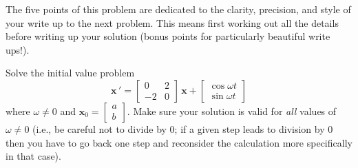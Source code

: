 \documentclass[11pt,letterpaper,boxed]{hmcpset}
\begin{document}
\begin{problem}[3.] The five points of this problem are dedicated to the clarity, precision, and style of your write up to the next problem.  This means first
working out all the details before writing up your solution (bonus points for particularly beautiful write ups!). 
\end{problem}

\begin{solution}
\vfill
\end{solution}
\newpage

\begin{problem}[4.] Solve the initial value problem
\[  \mathbf{x} \, ' = \begin{bmatrix} 0 & 2 \\ -2 & 0 \end{bmatrix} \, \mathbf{x} + \begin{bmatrix} \cos \omega t \\ \sin \omega t \end{bmatrix}  \]
where $\omega \neq 0$ and $\mathbf{x}_0 = \begin{bmatrix} a \\ b \end{bmatrix}$.
  Make sure your solution is valid for \textit{all} values of $\omega \neq 0$ (i.e., 
 be careful not to divide by $0$; if a given step leads to division by $0$ then you have to go back one step and reconsider the calculation more specifically in that case).  
\end{problem}

\begin{solution}
\vfill
\end{solution}
\newpage
\end{document}
